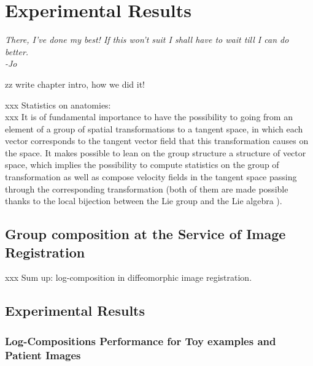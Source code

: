 \chapter{Experimental Results}\label{ch:results}

\begin{flushright}
	\emph{There, I’ve done my best! If this won’t suit I shall have to wait till I can do better. \\ -Jo}
\end{flushright}

zz write chapter intro, how we did it!

xxx Statistics on anatomies: \\
xxx It is of fundamental importance to have the possibility to going from an element of a group of spatial transformations  to a tangent space, in which each vector corresponds to the tangent vector field that this transformation causes on the space. It makes possible to lean on the group structure a structure of vector space, which implies the possibility to compute statistics on the group of transformation as well as compose velocity fields in the tangent space passing through the corresponding transformation (both of them are made possible thanks to the local bijection between the Lie group and the Lie algebra ). \\

\section{Group composition at the Service of Image Registration}

xxx Sum up: log-composition in diffeomorphic image registration.\\




\section{Experimental Results}

\subsection{Log-Compositions Performance for Toy examples and Patient Images}


